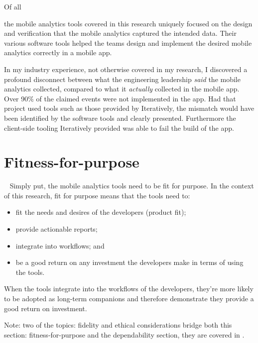 \hypertarget{tata-design-of-mobile-analytics-events-and-content}{Of all} the mobile analytics tools covered in this research  uniquely focused on the design and verification that the mobile analytics captured the intended data. Their various software tools helped the teams design and implement the desired mobile analytics correctly in a mobile app.

\begin{kaobox}[frametitle=Industrial example of a major disconnect between perception and reality]
In my industry experience, not otherwise covered in my research, I discovered a profound disconnect between what the engineering leadership \emph{said} the mobile analytics collected, compared to what it \emph{actually} collected in the mobile app. Over 90\% of the claimed events were not implemented in the app. Had that project used tools such as those provided by Iteratively, the mismatch would have been identified by the software tools and clearly presented. Furthermore the client-side tooling Iteratively provided was able to fail the build of the app. 
\end{kaobox}

\section{Fitness-for-purpose}~\label{tata-fitness-for-purpose-section}
Simply put, the mobile analytics tools need to be fit for purpose. In the context of this research, fit for purpose means that the tools need to:

\begin{itemize}
    \itemsep0em
    \item fit the needs and desires of the developers (product fit); 
    \item provide actionable reports; 
    \item integrate into workflows; and 
    \item be a good return on any investment the developers make in terms of using the tools.
\end{itemize}

 
When the tools integrate into the workflows of the developers, they're more likely to be adopted as long-term companions and therefore demonstrate they provide a good return on investment. 

Note: two of the topics: fidelity and ethical considerations bridge both this section: fitness-for-purpose and the dependability section, they are covered in .


